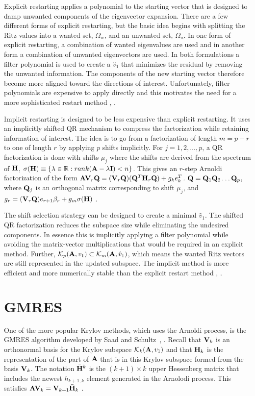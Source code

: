 Explicit restarting applies a polynomial to the starting vector that is designed to damp unwanted components of the eigenvector expansion. There are a few different forms of explicit restarting, but the basic idea begins with splitting the Ritz values into a wanted set, $\Omega_w$, and an unwanted set, $\Omega_u$. In one form of explicit restarting, a combination of wanted eigenvalues are used and in another form a combination of unwanted eigenvectors are used. In both formulations a filter polynomial is used to create a $\hat{v}_1$ that minimizes the residual by removing the unwanted information. The components of the new starting vector therefore become more aligned toward the directions of interest. Unfortunately, filter polynomials are expensive to apply directly and this motivates the need for a more sophisticated restart method \cite{Sorensen1996}, \cite{Stewart2001}.

Implicit restarting is designed to be less expensive than explicit restarting. It uses an implicitly shifted QR mechanism to compress the factorization while retaining information of interest. The idea is to go from a factorization of length $m = p + r$ to one of length $r$ by applying $p$ shifts implicitly. For $j = 1,2,\dots,p$, a QR factorization is done with shifts $\mu_j$ where the shifts are derived from the spectrum of $\mathbf{H}$, $\sigma(\mathbf{H}) \equiv \{\lambda \in \mathbb{R}: rank(\mathbf{A} - \lambda \mathbf{I}) < n\}$. This gives an $r$-step Arnoldi factorization of the form $\mathbf{AV}_r \mathbf{Q} = (\mathbf{V}_r \mathbf{Q})(\mathbf{Q}^T \mathbf{H}_r \mathbf{Q}) + g_k e^T_k$. $\mathbf{Q} = \mathbf{Q}_1 \mathbf{Q}_2 \dots \mathbf{Q}_p$, where $\mathbf{Q}_j$ is an orthogonal matrix corresponding to shift $\mu_j$, and $g_r = (\mathbf{V}_r \mathbf{Q}) e_{r+1} \beta_r + g_m \sigma(\mathbf{H})$ \cite{Sorensen1996}.

The shift selection strategy can be designed to create a minimal $\hat{v}_1$. The shifted QR factorization reduces the subspace size while eliminating the undesired components. In essence this is implicitly applying a filter polynomial while avoiding the matrix-vector multiplications that would be required in an explicit method. Further, $\mathcal{K}_p(\mathbf{A},v_1) \subset \mathcal{K}_m(\mathbf{A}, \hat{v}_1)$, which means the wanted Ritz vectors are still represented in the updated subspace. The implicit method is more efficient and more numerically stable than the explicit restart method \cite{Sorensen1996}, \cite{Stewart2001}.

\section{GMRES}
One of the more popular Krylov methods, which uses the Arnoldi process, is the GMRES algorithm developed by Saad and Schultz~\cite{Saad1986}, \cite{Knoll2004}. Recall that $\mathbf{V}_{k}$ is an orthonormal basis for the Krylov subspace $\mathcal{K}_{k}(\mathbf{A}, v_1)$ and that $\mathbf{H}_{k}$ is the representation of the part of $\mathbf{A}$ that is in this Krylov subspace formed from the basis $\mathbf{V}_{k}$. The notation $\bar{\mathbf{H}}^{k}$ is the $(k+1) \times k$ upper Hessenberg matrix that includes the newest $h_{k+1,k}$ element generated in the Arnolodi process. This satisfies $\mathbf{AV}_{k} = \mathbf{V}_{k+1}\bar{\mathbf{H}}_{k}$ \cite{Saad1986}. 

